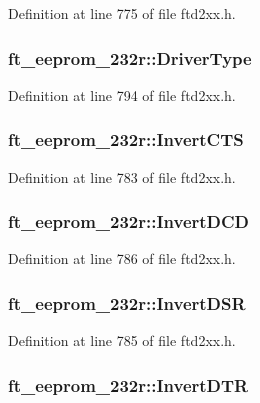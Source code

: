 Definition at line 775 of file ftd2xx.h.\hypertarget{structft__eeprom__232r_a43812e19d6119e277b91f10e8db8b651}{
\subsubsection[{DriverType}]{ {\bf ft\_\-eeprom\_\-232r::DriverType}}}
\label{structft__eeprom__232r_a43812e19d6119e277b91f10e8db8b651}


Definition at line 794 of file ftd2xx.h.\hypertarget{structft__eeprom__232r_a95c9b6e2547151c62c36a981e3d121e6}{
\subsubsection[{InvertCTS}]{ {\bf ft\_\-eeprom\_\-232r::InvertCTS}}}
\label{structft__eeprom__232r_a95c9b6e2547151c62c36a981e3d121e6}


Definition at line 783 of file ftd2xx.h.\hypertarget{structft__eeprom__232r_a5ed1bcd1082728d070876c21c167743e}{
\subsubsection[{InvertDCD}]{ {\bf ft\_\-eeprom\_\-232r::InvertDCD}}}
\label{structft__eeprom__232r_a5ed1bcd1082728d070876c21c167743e}


Definition at line 786 of file ftd2xx.h.\hypertarget{structft__eeprom__232r_af9f2706ecbe6182d52bce8d237cc9162}{
\subsubsection[{InvertDSR}]{ {\bf ft\_\-eeprom\_\-232r::InvertDSR}}}
\label{structft__eeprom__232r_af9f2706ecbe6182d52bce8d237cc9162}


Definition at line 785 of file ftd2xx.h.\hypertarget{structft__eeprom__232r_a782d2b0ecc30bae4b3f967fc349f6808}{
\subsubsection[{InvertDTR}]{ {\bf ft\_\-eeprom\_\-232r::InvertDTR}}}
\label{structft__eeprom__232r_a782d2b0ecc30bae4b3f967fc349f6808}


